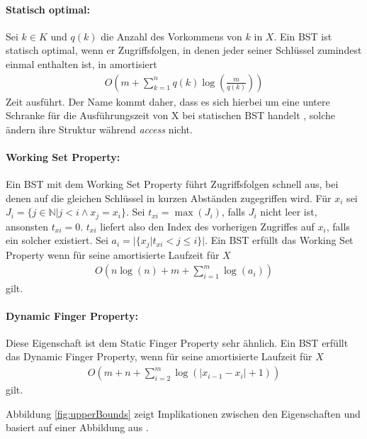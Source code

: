 \documentclass[a4paper,12pt]{article}
\begin{document}
\paragraph{Statisch optimal:}
Sei $k \in K$ und $q(k)$ die Anzahl des Vorkommens von $k$ in  $X$. Ein BST ist statisch optimal, wenn er Zugriffsfolgen, in denen jeder seiner Schlüssel zumindest einmal enthalten ist, in amortisiert 
\begin{align*}
O\left(m +\sum_{k = 1}^{n}q(k)\log \left( \frac{m}{q(k)} \right)\right) 
\end{align*}
Zeit ausführt. Der Name kommt daher, dass es sich hierbei um eine untere Schranke für die Ausführungszeit von X bei statischen BST handelt \cite{staticOptimal}, solche ändern ihre Struktur während \textit{access} nicht.

\paragraph{Working Set Property:}
Ein BST mit dem Working Set Property führt Zugriffsfolgen schnell aus, bei denen auf die gleichen Schlüssel in kurzen Abständen zugegriffen wird.
Für $x_i$ sei $J_i = \{j \in \mathbb{N} \vert j < i \land x_j = x_i \}$.
Sei $t_{xi} = \max \left(J_i\right)$, falls $J_i$ nicht leer ist, ansonsten $t_{xi} = 0$. $t_{xi}$ liefert also den Index des vorherigen Zugriffes auf $x_i$, falls ein solcher existiert. Sei ${a_i = \vert\{x_j \vert t_{xi} < j \leq i   \} \vert }$.
Ein BST erfüllt das Working Set Property wenn für seine amortisierte Laufzeit für $X$
\begin{align*}
O\left(n \log\left( n\right) + m +\sum_{i = 1}^{m} \log \left(a_i\right) \right)
\end{align*} 
gilt. 


\paragraph{Dynamic Finger Property:}
Diese Eigenschaft ist dem Static Finger Property sehr ähnlich.
Ein BST erfüllt das Dynamic Finger Property, wenn für seine amortisierte Laufzeit für $X$
\begin{align*}
O\left( m + n + \sum_{i = 2}^{m} \log \left(\vert x_{i-1} - x_i  \vert	+ 1	\right)\right)
\end{align*} 
gilt. 

\noindent Abbildung \ref{fig:upperBounds} zeigt Implikationen zwischen den Eigenschaften und basiert auf einer Abbildung aus \cite{upperBounds}.
\end{document}
